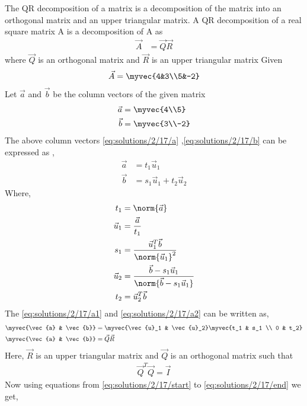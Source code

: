 The QR decomposition  of a matrix is a decomposition of the matrix into an orthogonal matrix and an upper triangular matrix. A QR decomposition of a real square matrix A is a decomposition of A as
\begin{align}
    \vec{A}&=\vec{Q}\vec{R}
\end{align}
where $\vec{Q}$ is an orthogonal matrix and $\vec{R}$ is an upper triangular matrix
Given 
\begin{align}
    \vec{A}=\myvec{4&3\\5&-2}
\end{align}
Let $\vec{a}$ and $\vec{b}$ be the column vectors of the given matrix
\begin{align}
\vec{a}&=\myvec{4\\5}\label{eq:solutions/2/17/a}\\
\vec{b}&=\myvec{3\\-2}\label{eq:solutions/2/17/b}
\end{align}
The above column vectors \eqref{eq:solutions/2/17/a} ,\eqref{eq:solutions/2/17/b} can be expressed as ,
\begin{align}
\vec{a}&=t_1\vec{u}_1\label{eq:solutions/2/17/a1}\\
\vec{b}&=s_1\vec{u}_1+t_2\vec{u}_2\label{eq:solutions/2/17/a2}
\end{align}
Where, 
\begin{align}
t_1 &= \norm{\vec{a}}\label{eq:solutions/2/17/start}\\
\vec{u}_1 &= \frac{\vec{a}}{t_1}\\
s_1 &= \frac{\vec{u}_1^T\vec{b}}{\norm{\vec{u}_1}^2}\\
\vec{u}_2 &= \frac{\vec{b} - s_1 \vec{u}_1}{\norm{\vec{b} - s_1 \vec{u}_1}}\\
t_2 &= {\vec{u}_2^T\vec{b}}\label{eq:solutions/2/17/end}
\end{align}
The \eqref{eq:solutions/2/17/a1} and \eqref{eq:solutions/2/17/a2} can be written as, 
\begin{align}
\myvec{\vec{a} & \vec{b}} &= \myvec{\vec{u}_1 & \vec{u}_2}\myvec{t_1 & s_1 \\ 0 & t_2}\\
\myvec{\vec{a} & \vec{b}} &= \vec{Q}\vec{R}\label{eq:solutions/2/17/final}
\end{align}
Here, $\vec{R}$ is an upper triangular matrix and $\vec{Q}$ is an orthogonal matrix such that
\begin{align}
\vec{Q}^T\vec{Q}=\vec{I}
\end{align}
Now using equations from \eqref{eq:solutions/2/17/start} to \eqref{eq:solutions/2/17/end} we get, 
